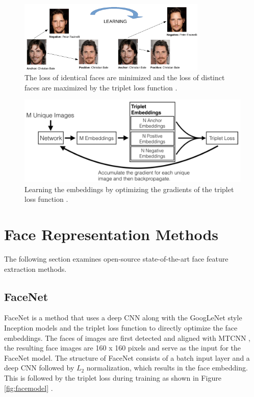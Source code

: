 \documentclass[12pt,english]{article}
\begin{document}
\begin{figure}[!tbp]
 \centering
    \includegraphics[width=0.8\textwidth]{figures/triplet_loss_example.png}
    \caption{The loss of identical faces are minimized and the loss of distinct faces are maximized by the triplet loss function \cite{pic1} \cite{pic2}.}
	\label{fig:bale}
\end{figure}

\begin{figure}[!tbp]
 \centering
    \includegraphics[width=0.7\columnwidth]{figures/openface_architecture.png}
    \caption{Learning the embeddings by optimizing the gradients of the triplet loss function \cite{amos}.}
	\label{fig:loss}
\end{figure}
 
\section{Face Representation Methods}
\label{facemethod}

The following section examines open-source state-of-the-art face feature extraction methods.

\subsection{FaceNet}

\quad

FaceNet is a method that uses a deep CNN along with the GoogLeNet style Inception models and the triplet loss function to directly optimize the face embeddings. The faces of images are first detected and aligned with MTCNN \cite{sandberg}, the resulting face images are 160 x 160 pixels and serve as the input for the FaceNet model. The structure of FaceNet consists of a batch input layer and a deep CNN followed by $L_{2}$ normalization, which results in the face embedding. This is followed by the triplet loss during training as shown in Figure \ref{fig:facemodel} \cite{schroff}.
\end{document}
